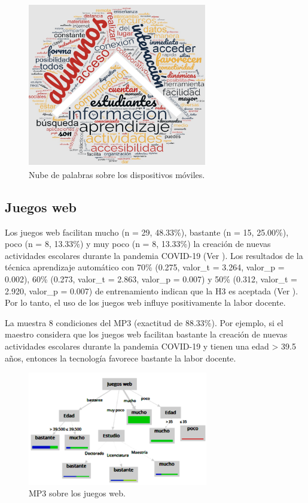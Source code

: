 \documentclass[spanish]{textolivre}
\begin{document}
\begin{figure}[htbp]
 \centering
 \includegraphics[width=0.7\textwidth]{37074-pag5.png}
 \caption{Nube de palabras sobre los dispositivos móviles.}
 \label{fig5}
\end{figure}

\subsection{Juegos web}
Los juegos web facilitan mucho (n = 29, 48.33\%), bastante (n = 15, 25.00\%), poco (n = 8, 13.33\%) y muy poco (n = 8, 13.33\%) la creación de nuevas actividades escolares durante la pandemia COVID-19 (Ver ). Los resultados de la técnica aprendizaje automático con 70\% (0.275, valor\_t = 3.264, valor\_p = 0.002), 60\% (0.273, valor\_t = 2.863, valor\_p = 0.007) y 50\% (0.312, valor\_t = 2.920, valor\_p = 0.007) de entrenamiento indican que la H3 es aceptada (Ver ). Por lo tanto, el uso de los juegos web influye positivamente la labor docente.

La  muestra 8 condiciones del MP3 (exactitud de 88.33\%). Por ejemplo, si el maestro considera que los juegos web facilitan bastante la creación de nuevas actividades escolares durante la pandemia COVID-19 y tienen una edad > 39.5 años, entonces la tecnología favorece bastante la labor docente.

\begin{figure}[htbp]
 \centering
 \includegraphics[width=0.7\textwidth]{37074-pag6.png}
 \caption{MP3 sobre los juegos web.}
 \label{fig6}
\end{figure}
\end{document}
